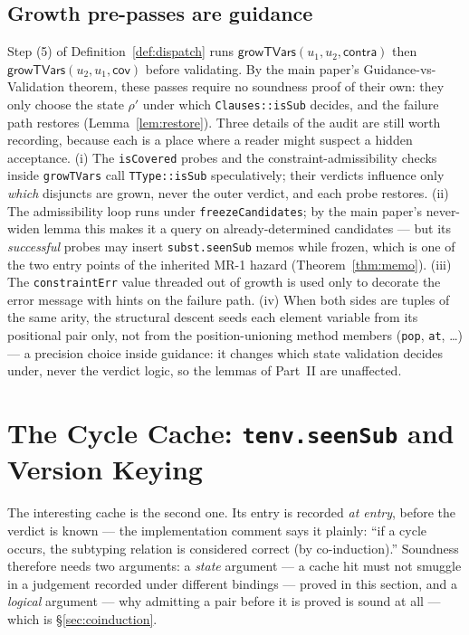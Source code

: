 \documentclass[11pt]{article}
\begin{document}
\subsection{Growth pre-passes are guidance}
\label{sec:growth}

Step (5) of Definition~\ref{def:dispatch} runs
$\mathsf{growTVars}(u_1,u_2,\mathsf{contra})$ then
$\mathsf{growTVars}(u_2,u_1,\mathsf{cov})$ before validating. By the main
paper's Guidance-vs-Validation theorem, these passes require no soundness
proof of their own: they only choose the state $\rho'$ under which
\texttt{Clauses::isSub} decides, and the failure path restores
(Lemma~\ref{lem:restore}). Three details of the audit are still worth
recording, because each is a place where a reader might suspect a hidden
acceptance. (i) The \texttt{isCovered} probes and the
constraint-admissibility checks inside \texttt{growTVars} call
\texttt{TType::isSub} speculatively; their verdicts influence only
\emph{which} disjuncts are grown, never the outer verdict, and each probe
restores. (ii) The admissibility loop runs under
\texttt{freezeCandidates}; by the main paper's never-widen lemma this
makes it a query on already-determined candidates --- but its
\emph{successful} probes may insert \texttt{subst.seenSub} memos while
frozen, which is one of the two entry points of the inherited MR-1
hazard (Theorem~\ref{thm:memo}). (iii) The
\texttt{constraintErr} value threaded out of growth is used only to decorate
the error message with hints on the failure path. (iv) When both sides
are tuples of the same arity, the structural descent seeds each element
variable from its positional pair only, not from the position-unioning
method members (\texttt{pop}, \texttt{at}, \ldots) --- a precision
choice inside guidance: it changes which state validation decides under,
never the verdict logic, so the lemmas of Part~II are unaffected.

\section{The Cycle Cache: \texttt{tenv.seenSub} and Version Keying}
\label{sec:tenvseen}

The interesting cache is the second one. Its entry is recorded \emph{at
entry}, before the verdict is known --- the implementation comment says
it plainly: ``if a cycle occurs, the subtyping relation is considered
correct (by co-induction).'' Soundness therefore needs two arguments: a
\emph{state} argument --- a cache hit must not smuggle in a judgement
recorded under different bindings --- proved in this section, and a
\emph{logical} argument --- why admitting a pair before it is proved is
sound at all --- which is \S\ref{sec:coinduction}.
\end{document}
